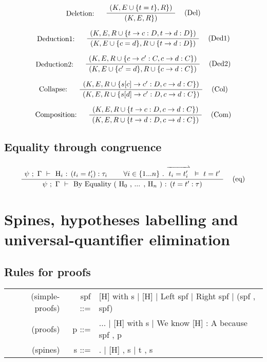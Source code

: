 \documentclass[twoside,a4paper]{article}
\theoremstyle{definition}
\begin{document}
\[
\AxiomC{$(K,E \cup \{t = t \},R\})$}
\LeftLabel{Deletion: \quad}
\RightLabel{\quad (Del)}
\UnaryInfC{$(K,E,R\})$}
\DisplayProof
\]

\[
\AxiomC{$(K,E,R \cup \{t \rightarrow c : D , t \rightarrow d : D \})$}
\LeftLabel{Deduction1: \quad}
\RightLabel{\quad (Ded1)}
\UnaryInfC{$(K,E \cup \{c = d \},R \cup \{t \rightarrow d : D\})$}
\DisplayProof
\]

\[
\AxiomC{$(K,E,R \cup \{c \rightarrow c' : C , c \rightarrow d : C \})$}
\LeftLabel{Deduction2: \quad}
\RightLabel{\quad (Ded2)}
\UnaryInfC{$(K,E \cup \{c' = d \},R \cup \{c \rightarrow d : C\})$}
\DisplayProof
\]

\[
\AxiomC{$(K,E,R \cup \{s[c] \rightarrow c' : D , c \rightarrow d : C \})$}
\LeftLabel{Collapse: \quad}
\RightLabel{\quad (Col)}
\UnaryInfC{$(K,E,R \cup \{s[d] \rightarrow c' : D , c \rightarrow d : C \})$}
\DisplayProof
\]

\[
\AxiomC{$(K,E,R \cup \{t \rightarrow c : D , c \rightarrow d : C \})$}
\LeftLabel{Composition: \quad}
\RightLabel{\quad (Com)}
\UnaryInfC{$(K,E,R \cup \{t \rightarrow d : D , c \rightarrow d : C \})$}
\DisplayProof
\]

\subsection{Equality through congruence}

\[
\AxiomC{$\psi~ ;~ \Gamma ~\vdash~$ H$_i$ : $(t_i = t_i ') : \tau_i$}
\AxiomC{$\forall i \in \{1 ... n\}~ . ~ \overset{\xrightharpoonup{~~~~~~~~}}{t_i = t_i '} ~\vDash~ t = t'$}
\RightLabel{\quad (eq)}
\BinaryInfC{$\psi~ ;~ \Gamma ~\vdash~$ By Equality ( H$_0$ , ... , H$_n$ ) : ($t = t' : \tau$)}
\DisplayProof
\]

\section{Spines, hypotheses labelling and universal-quantifier elimination}

\subsection{Rules for proofs}

\begin{center}
\begin{tabular}{rrl}

(simple-proofs) & \quad spf ::=& [H] with s $\mid$ [H] $\mid$ Left spf $\mid$  Right spf $\mid$ (spf , spf)
\\
(proofs) & \quad p ::=& ... $\mid$ [H] with s $\mid$ We know [H] : A because spf , p
\\
(spines) & \quad s ::=& . $\mid$ [H] , s $\mid$ t , s

\end{tabular}
\end{center}
\end{document}
